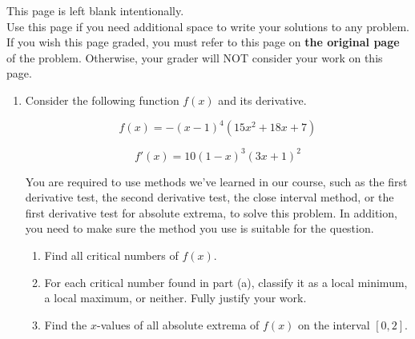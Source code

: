 \documentclass[11pt]{article}
\begin{document}
{    }

\vfill


\newpage

This page is left blank intentionally.\\

Use this page if you need additional space to write your solutions to any problem. \\

If you wish this page graded, you must refer to this page on \textbf{the original page} of the problem. Otherwise, your grader will NOT consider your work on this page.

\newpage%


\begin{enumerate}


\item Consider the following function $f(x)$ and its derivative.

\[f(x)=-(x-1)^4(15x^2+18x+7)\]

\[f'(x)=10(1-x)^3(3x+1)^2\]

You are required to use methods we've learned in our course, such as the first derivative test, the second derivative test, the close interval method, or the first derivative test for absolute extrema, to solve this problem. In addition, you need to make sure the method you use is suitable for the question.

\begin{enumerate}
    \item Find all critical numbers of $f(x)$.

    \vfill

    \item For each critical number found in part (a), classify it as a local minimum, a local maximum, or neither. Fully justify your work.

    \vfill
    \vfill
    \vfill

    \item Find the $x$-values of all absolute extrema of $f(x)$ on the interval $[0, 2]$.

    \vfill
    \vfill
    \vfill
\end{enumerate}



\end{enumerate}
\end{document}
